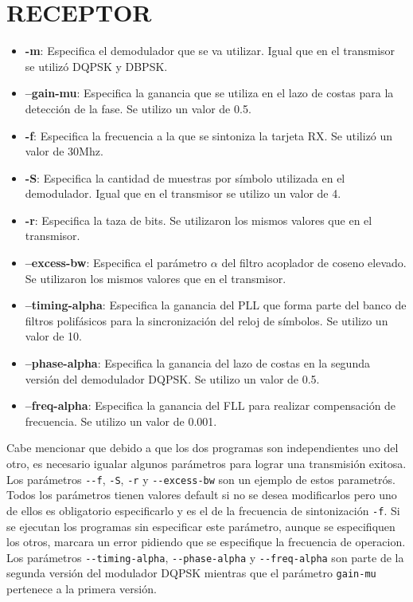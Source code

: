\section*{RECEPTOR}
\begin{itemize}
  \item \textbf{-m}: Especifica el demodulador que se va utilizar. Igual que en el transmisor se
  utiliz\'o DQPSK y DBPSK.
  \item \textbf{--gain-mu}: Especifica la ganancia que se utiliza en el lazo de costas para la
  detecci\'on de la fase. Se utilizo un valor de 0.5.
  \item \textbf{-f}: Especifica la frecuencia a la que se sintoniza la tarjeta RX. Se utiliz\'o un
  valor de 30Mhz.
  \item \textbf{-S}: Especifica la cantidad de muestras por s\'imbolo utilizada en el demodulador.
  Igual que en el transmisor se utilizo un valor de 4.
  \item \textbf{-r}: Especifica la taza de bits. Se utilizaron los mismos valores que en el
  transmisor.
  \item \textbf{--excess-bw}: Especifica el par\'ametro $\alpha$ del filtro acoplador de coseno
  elevado. Se utilizaron los mismos valores que en el transmisor.
  \item \textbf{--timing-alpha}: Especifica la ganancia del PLL que forma parte del banco de filtros
  polif\'asicos para la sincronizaci\'on del reloj de s\'imbolos. Se utilizo un valor de 10.
  \item \textbf{--phase-alpha}: Especifica la ganancia del lazo de costas en la segunda versi\'on
  del demodulador DQPSK. Se utilizo un valor de 0.5.
  \item \textbf{--freq-alpha}: Especifica la ganancia del FLL para realizar compensaci\'on de
  frecuencia. Se utilizo un valor de 0.001.
\end{itemize}

Cabe mencionar que debido a que los dos programas son independientes uno del otro, es necesario
igualar algunos par\'ametros para lograr una transmisi\'on exitosa. Los par\'ametros \verb|--f|,
\verb|-S|, \verb|-r| y \verb|--excess-bw| son un ejemplo de estos parametr\'os. Todos los
par\'ametros tienen valores default si no se desea modificarlos pero uno de ellos es obligatorio
especificarlo y es el de la frecuencia de sintonizaci\'on \verb|-f|. Si se ejecutan los programas
sin especificar este par\'ametro, aunque se especifiquen los otros, marcara un error pidiendo que
se especifique la frecuencia de operacion. Los par\'ametros \verb|--timing-alpha|,
\verb|--phase-alpha| y \verb|--freq-alpha| son parte de la segunda versi\'on del modulador DQPSK
mientras que el par\'ametro \verb|gain-mu| pertenece a la primera versi\'on. 
